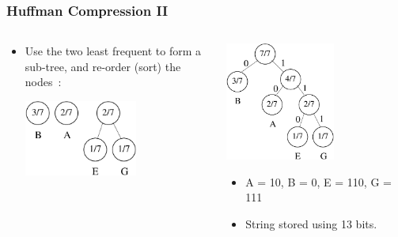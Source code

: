 \begin{frame}[fragile]
\frametitle{Huffman Compression II}
\begin{columns}[T]

\begin{column}{0.45\textwidth}
\begin{itemize}[<+->]
\item Use the two least frequent to form a sub-tree, and re-order (sort) the nodes~:

\pause
\vspace*{2ex}
\begin{center}
\includegraphics[width=0.6\textwidth]{../Images/huff2.pdf}
\end{center}
\end{itemize}
\end{column}

\pause
\begin{column}{0.45\textwidth}
\begin{center}
\includegraphics[width=0.6\textwidth]{../Images/huff3.pdf}
\end{center}
\pause
\begin{itemize}[<+->]
\item A = 10, B = 0, E = 110, G = 111
\item String stored using 13 bits.
\end{itemize}
\end{column}

\end{columns}
\end{frame}

